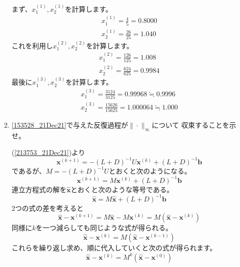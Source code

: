 \documentclass[12pt,b5paper]{ltjsarticle}
\begin{document}
\begin{enumerate}
       まず、$x_1^{(1)}, x_2^{(1)}$を計算します。
       \begin{align}
        x_1^{(1)} = \frac{4}{5} = 0.8000\\
        x_2^{(1)} = \frac{26}{25} = 1.040
       \end{align}
       これを利用し$x_1^{(2)}, x_2^{(2)}$を計算します。
       \begin{align}
        x_1^{(2)} = \frac{126}{125} = 1.008\\
        x_2^{(2)} = \frac{624}{625} = 0.9984
       \end{align}
       最後に$x_1^{(3)}, x_2^{(3)}$を計算します。
       \begin{align}
        x_1^{(3)} = \frac{3124}{3125} = 0.99968 \fallingdotseq 0.9996\\
        x_2^{(3)} = \frac{15626}{15625} = 1.000064 \fallingdotseq 1.000
       \end{align}

       \hrulefill
 \item \ref{153528_21Dec21}で与えた反復過程が$\|\cdot\|_{\infty}$について
       収束することを示せ。

       \dotfill

       (\ref{213753_21Dec21})より
       \begin{equation}
        \bm{x}^{(k+1)}= -(L+D)^{-1}U\bm{x}^{(k)}+(L+D)^{-1}\bm{b}
       \end{equation}
       であるが、$M=-(L+D)^{-1}U$とおくと次のようになる。
       \begin{equation}
        \bm{x}^{(k+1)}= M\bm{x}^{(k)}+(L+D)^{-1}\bm{b}
       \end{equation}
       連立方程式の解を$\hat{\bm{x}}$とおくと次のような等号である。
       \begin{equation}
        \hat{\bm{x}}= M\hat{\bm{x}}+(L+D)^{-1}\bm{b}
       \end{equation}
       2つの式の差を考えると
       \begin{equation}
        \hat{\bm{x}}-\bm{x}^{(k+1)}= M\hat{\bm{x}}-M\bm{x}^{(k)}=M(\hat{\bm{x}}-\bm{x}^{(k)})
       \end{equation}
       同様に$k$を一つ減らしても同じような式が得られる。
       \begin{equation}
        \hat{\bm{x}}-\bm{x}^{(k)}=M(\hat{\bm{x}}-\bm{x}^{(k-1)})
       \end{equation}
       これらを繰り返し求め、順に代入していくと次の式が得られます。
       \begin{equation}
        \hat{\bm{x}}-\bm{x}^{(k)}=M^k(\hat{\bm{x}}-\bm{x}^{(0)})
       \end{equation}


\end{enumerate}
\end{document}
